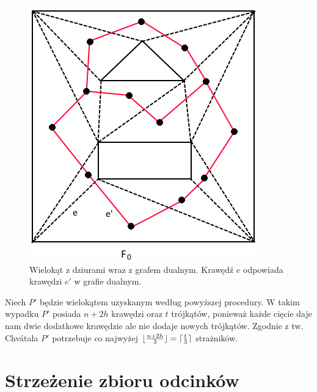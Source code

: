 \documentclass[brudnopis]{xmgr}
\DeclarePairedDelimiter\ceil{\lceil}{\rceil}
\DeclarePairedDelimiter\floor{\lfloor}{\rfloor}
\begin{document}
\begin{figure}[h!]
  \centering
    \includegraphics{rysunki/triangulacja_dziury.png}
    \caption{Wielokąt z dziurami wraz z grafem dualnym. Krawędź $e$ odpowiada krawędzi $e'$ w grafie dualnym.}
    \vspace{3in}
    \label{fig:triangulacja}
\end{figure} 

\indent Niech $P'$ będzie wielokątem uzyskanym według powyższej procedury. W takim wypadku $P'$ posiada $n + 2h$ krawędzi oraz $t$ trójkątów, ponieważ każde cięcie daje nam dwie dodatkowe krawędzie ale nie dodaje nowych trójkątów. Zgodnie z tw. Chv\'atala $P'$ potrzebuje co najwyżej $\floor{\frac{n+2h}{3}} = \ceil{\frac{t}{3}}$ strażników.

\chapter{Strzeżenie zbioru odcinków}
\end{document}
